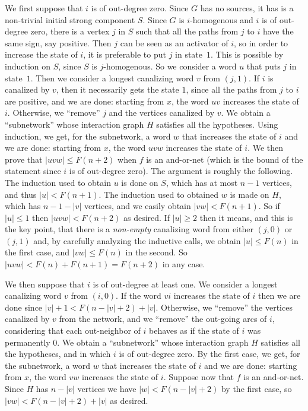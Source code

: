 \documentclass[11pt,letter]{article}
\begin{document}
\medskip
We first suppose that $i$ is of out-degree zero. Since $G$ has no sources, it has is a non-trivial initial strong component $S$. Since $G$ is $i$-homogenous and $i$ is of out-degree zero, there is a vertex $j$ in $S$ such that all the paths from $j$ to $i$ have the same sign, say positive. Then $j$ can be seen as an activator of $i$, so in order to increase the state of $i$, it is preferable to put $j$ in state~$1$. This is possible by induction on $S$, since $S$ is $j$-homogenous. So we consider a word $u$ that puts $j$ in state~$1$. Then we consider a longest canalizing word $v$ from $(j,1)$. If $i$ is canalized by $v$, then it necessarily gets the state $1$, since all the paths from $j$ to $i$ are positive, and we are done: starting from $x$, the word $uv$ increases the state of $i$. Otherwise, we ``remove'' $j$ and the vertices canalized by $v$. We obtain a ``subnetwork'' whose interaction graph $H$ satisfies all the hypotheses. Using induction, we get, for the subnetwork, a word $w$ that increases the state of $i$ and we are done: starting from $x$, the word $uvw$ increases the state of $i$. We then prove that $|uvw|\leq F(n+2)$ when $f$ is an and-or-net (which is the bound of the statement since $i$ is of out-degree zero). The argument is roughly the following. The induction used to obtain $u$ is done on $S$, which has at most $n-1$ vertices, and thus $|u|< F(n+1)$. The induction used to obtained $w$ is made on $H$, which has $n-1-|v|$ vertices, and we easily obtain $|vw|<F(n+1)$. So if $|u|\leq 1$ then $|uvw|<F(n+2)$ as desired. If $|u|\geq 2$ then it means, and this is the key point, that there is a {\em non-empty} canalizing word from either $(j,0)$ or $(j,1)$ and, by carefully analyzing the inductive calls, we obtain $|u|\leq F(n)$ in the first case, and $|vw|\leq F(n)$ in the second. So $|uvw|<F(n)+F(n+1)=F(n+2)$ in any case.

\medskip
We then suppose that $i$ is of out-degree at least one. We consider a longest canalizing word $v$ from $(i,0)$. If the word $vi$ increases the state of $i$ then we are done since $|v|+1< F(n-|v|+2)+|v|$. Otherwise, we ``remove'' the vertices canalized by $v$ from the network, and we ``remove'' the out-going arcs of $i$, considering that each out-neighbor of $i$ behaves as if the state of $i$ was permanently $0$.  We obtain a ``subnetwork'' whose interaction graph $H$ satisfies all the hypotheses, and in which $i$ is of out-degree zero. By the first case, we get, for the subnetwork, a word $w$ that increases the state of $i$ and we are done: starting from $x$, the word $vw$ increases the state of $i$. Suppose now that $f$ is an and-or-net. Since $H$ has $n-|v|$ vertices we have $|w|< F(n-|v|+2)$ by the first case, so $|vw|< F(n-|v|+2)+|v|$ as desired. 
\end{document}
